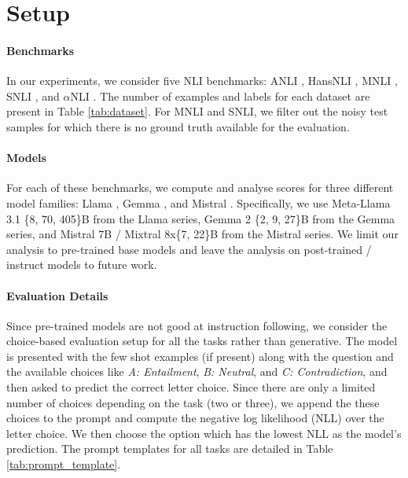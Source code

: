 \section{Setup}

\paragraph{Benchmarks} In our experiments, we consider five NLI benchmarks: ANLI \citep{nie-etal-2020-adversarial}, HansNLI \citep{mccoy-etal-2019-right}, MNLI \citep{williams-etal-2018-broad}, SNLI \citep{bowman-etal-2015-large}, and $\alpha$NLI \citep{bhagavatula2020abductive}. 
The number of examples and labels for each dataset are present in Table \ref{tab:dataset}. 
For MNLI and SNLI, we filter out the noisy test samples for which there is no ground truth available for the evaluation. %

\paragraph{Models} For each of these benchmarks, we compute and analyse scores for three different model families: Llama \citep{dubey2024llama}, Gemma \citep{team2024gemma}, and Mistral \citep{jiang2023mistral, jiang2024mixtral}. 
Specifically, we use Meta-Llama 3.1 \{8, 70, 405\}B from the Llama series, Gemma 2 \{2, 9, 27\}B from the Gemma series, and Mistral 7B / Mixtral 8x\{7, 22\}B from the Mistral series.
We limit our analysis to pre-trained base models and leave the analysis on post-trained / instruct models to future work.

\paragraph{Evaluation Details} Since pre-trained models are not good at instruction following, we consider the choice-based evaluation setup for all the tasks rather than generative. The model is presented with the few shot examples (if present) along with the question and the available choices like \textit{A: Entailment}, \textit{B: Neutral}, and \textit{C: Contradiction}, and then asked to predict the correct letter choice. Since there are only a limited number of choices depending on the task (two or three), we append the these choices to the prompt and compute the negative log likelihood (NLL) over the letter choice. We then choose the option which has the lowest NLL as the model's prediction. The prompt templates for all tasks are detailed in Table \ref{tab:prompt_template}.


